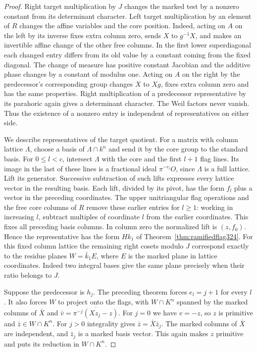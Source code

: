 \documentclass[a4paper,11pt]{article}
\theoremstyle{definition}
\theoremstyle{remark}
\numberwithin{equation}{section}
\begin{document}
\begin{proof}
Right target multiplication by \(J\) changes the marked
test by a nonzero constant from its determinant character.
Left target multiplication by an element of \(R\) changes
the affine variables and the core position. Indeed, acting
on \(A\) on the left by its inverse fixes extra column zero,
sends \(X\) to \(g^{-1}X\), and makes an invertible affine
change of the other free columns. In the first lower
superdiagonal each changed entry differs from its old
value by a constant coming from the fixed diagonal.
The change of measure has positive constant Jacobian
and the additive phase changes by a constant of modulus
one. Acting on \(A\) on the right by the predecessor's
corresponding group changes \(X\) to \(Xg\), fixes extra
column zero and has the same properties. Right multiplication
of a predecessor representative by its parahoric again gives
a determinant character. The Weil factors never vanish.
Thus the existence of a nonzero entry is independent of
representatives on either side.

We describe representatives of the target quotient. For a
matrix with column lattice \(\Lambda\), choose a basis of
\(\Lambda\cap k^n\) and send it by the core group to the
standard basis. For \(0\le l<c\), intersect \(\Lambda\)
with the core and the first \(l+1\) flag lines. Its image
in the last of these lines is a fractional ideal
\(\pi^{-e_l}O\), since \(\Lambda\) is a full lattice.
Lift its generator. Successive subtraction of such lifts
expresses every lattice vector in the resulting basis.
Each lift, divided by its pivot, has the form \(f_l\)
plus a vector in the preceding coordinates. The upper
unitriangular flag operations and the free core columns
of \(R\) remove these earlier entries for \(l\ge1\):
working in increasing \(l\), subtract multiples of
coordinate \(l\) from the earlier coordinates. This
fixes all preceding basis columns. In column zero the
normalized lift is \((z,f_0)\). Hence the representative
has the form \(H k_1\) of Theorem~\ref{thm:ramifiedflag324}.
For this fixed column lattice the remaining right cosets
modulo \(J\) correspond exactly to the residue planes
\(W=\bar k_1 E\), where \(E\) is the marked plane in
lattice coordinates. Indeed two integral bases give the
same plane precisely when their ratio belongs to \(J\).

Suppose the predecessor is \(h_j\). The preceding theorem
forces \(e_l=j+1\) for every \(l\). It also forces \(W\)
to project onto the flags, with \(W\cap K^n\) spanned by
the marked columns of \(\bar X\) and
\(\bar v=\overline{\pi^{-j}(Xz_j-z)}\).
For \(j=0\) we have \(v=-z\), so \(z\) is primitive and
\(\bar z\in W\cap K^n\). For \(j>0\) integrality gives
\(\bar z=\bar X\bar z_j\). The marked columns of \(\bar X\)
are independent, and \(\bar z_j\) is a marked basis
vector. This again makes \(z\) primitive and puts its
reduction in \(W\cap K^n\).


\end{proof}
\end{document}
